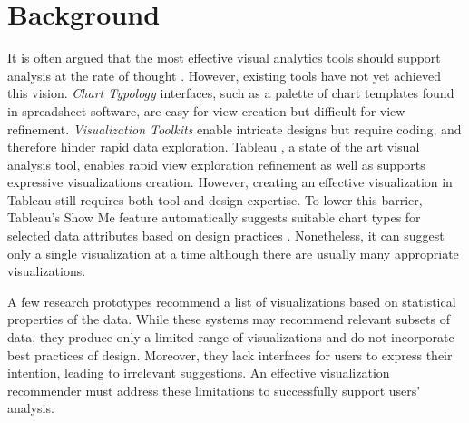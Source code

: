 \section*{Background}

It is often argued that the most effective visual analytics tools should support analysis at the rate of thought \cite{hanrahan:enthusiast}.
However, existing tools \cite{heer:dynamics} have not yet achieved this vision. \textit{Chart Typology} interfaces, such as a palette of chart templates found in spreadsheet software, are easy for view creation but difficult for view refinement.  \textit{Visualization Toolkits} \cite{bostock:d3, wilkinson:GoG} enable intricate designs but require coding, and therefore hinder rapid data exploration. Tableau \cite{stolte:polaris}, a state of the art visual analysis tool, enables rapid view exploration refinement as well as supports expressive visualizations creation.  However, creating an effective visualization in Tableau still requires both tool and design expertise.  To lower this barrier, Tableau's Show Me \cite{mackinlay:showme} feature automatically suggests suitable chart types for selected data attributes based on design practices \cite{tufte:visual, few:nowyouseeit}.  Nonetheless, it can suggest only a single visualization at a time although there are usually many appropriate visualizations.

A few research prototypes \cite{key:vizdeck, gotz:harvest, kandel:profiler} recommend a list of visualizations based on statistical properties of the data. While these systems may recommend relevant subsets of data, they produce only a limited range of visualizations and do not incorporate best practices of design.  Moreover, they lack interfaces for users to express their intention, leading to irrelevant suggestions.  An effective visualization recommender must address these limitations to successfully support users’ analysis.